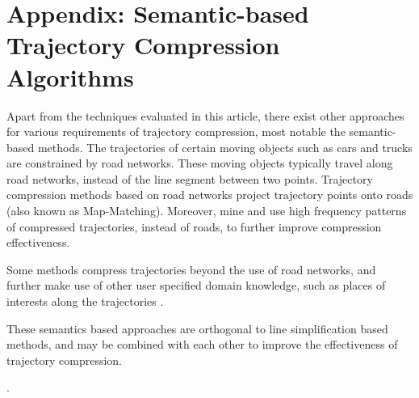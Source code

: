 \section*{{Appendix: Semantic-based Trajectory Compression Algorithms}}
Apart from the techniques evaluated in this article, there exist other approaches for various requirements of trajectory compression, most notable the semantic-based methods.
%
The trajectories of certain moving objects such as cars and trucks are constrained by road networks. These moving objects typically travel along road networks, instead of the line segment between two points. Trajectory compression methods based on road networks \cite{Chen:Trajectory, Popa:Spatio,Civilis:Techniques,Hung:Clustering, Gotsman:Compaction, Song:PRESS, Han:Compress}  project trajectory points onto roads (also known as Map-Matching). Moreover, \cite{Gotsman:Compaction, Song:PRESS, Han:Compress} mine and use high frequency patterns of compressed trajectories, instead of roads, to further improve compression effectiveness.

Some methods \cite{Schmid:Semantic, Richter:Semantic} compress trajectories beyond the use of road networks, and further make use of other user specified domain knowledge, such as places of interests along the trajectories \cite{Richter:Semantic}.

These  semantics based approaches are orthogonal to line simplification based methods, and may be combined with each other to  improve the effectiveness of trajectory compression.


.



